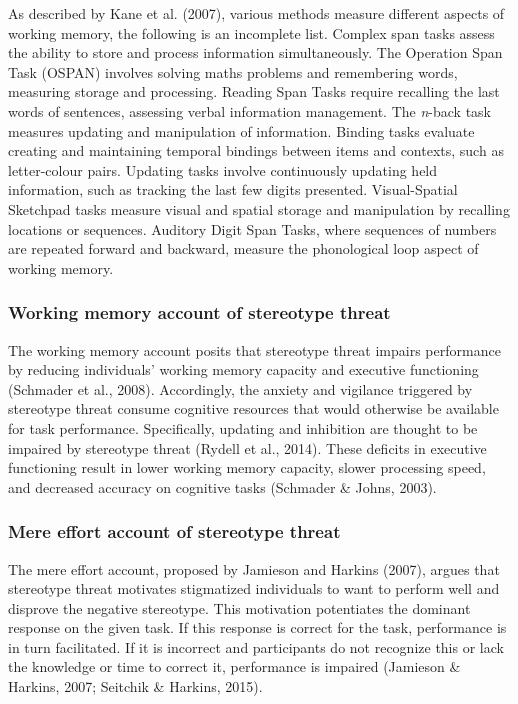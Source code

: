 \documentclass[
  stu, a4paper, 12pt,mask,floatsintext]{apa7}
\begin{document}
As described by Kane et al. (2007), various methods measure different aspects of working memory, the following is an incomplete list.
Complex span tasks assess the ability to store and process information simultaneously.
The Operation Span Task (OSPAN) involves solving maths problems and remembering words, measuring storage and processing.
Reading Span Tasks require recalling the last words of sentences, assessing verbal information management.
The \emph{n}-back task measures updating and manipulation of information.
Binding tasks evaluate creating and maintaining temporal bindings between items and contexts, such as letter-colour pairs.
Updating tasks involve continuously updating held information, such as tracking the last few digits presented.
Visual-Spatial Sketchpad tasks measure visual and spatial storage and manipulation by recalling locations or sequences.
Auditory Digit Span Tasks, where sequences of numbers are repeated forward and backward, measure the phonological loop aspect of working memory.

\subsubsection{Working memory account of stereotype threat}\label{working-memory-account-of-stereotype-threat}

The working memory account posits that stereotype threat impairs performance by reducing individuals' working memory capacity and executive functioning (Schmader et al., 2008).
Accordingly, the anxiety and vigilance triggered by stereotype threat consume cognitive resources that would otherwise be available for task performance.
Specifically, updating and inhibition are thought to be impaired by stereotype threat (Rydell et al., 2014).
These deficits in executive functioning result in lower working memory capacity, slower processing speed, and decreased accuracy on cognitive tasks (Schmader \& Johns, 2003).

\subsubsection{Mere effort account of stereotype threat}\label{mere-effort-account-of-stereotype-threat}

The mere effort account, proposed by Jamieson and Harkins (2007), argues that stereotype threat motivates stigmatized individuals to want to perform well and disprove the negative stereotype.
This motivation potentiates the dominant response on the given task.
If this response is correct for the task, performance is in turn facilitated. If it is incorrect and participants do not recognize this or lack the knowledge or time to correct it, performance is impaired (Jamieson \& Harkins, 2007; Seitchik \& Harkins, 2015).
\end{document}
